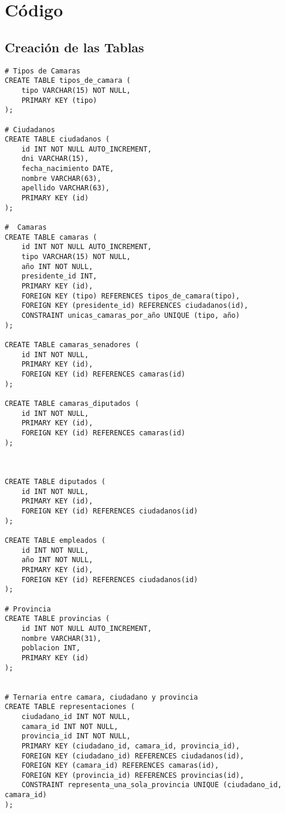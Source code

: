 \section{Código}

\subsection{Creación de las Tablas}
\begin{verbatim}
# Tipos de Camaras
CREATE TABLE tipos_de_camara (
    tipo VARCHAR(15) NOT NULL,
    PRIMARY KEY (tipo)
);

# Ciudadanos
CREATE TABLE ciudadanos (
    id INT NOT NULL AUTO_INCREMENT,
    dni VARCHAR(15),
    fecha_nacimiento DATE,
    nombre VARCHAR(63),
    apellido VARCHAR(63),
    PRIMARY KEY (id)
);

#  Camaras
CREATE TABLE camaras (
	id INT NOT NULL AUTO_INCREMENT,
    tipo VARCHAR(15) NOT NULL,
    año INT NOT NULL,
    presidente_id INT,
    PRIMARY KEY (id),
    FOREIGN KEY (tipo) REFERENCES tipos_de_camara(tipo),
    FOREIGN KEY (presidente_id) REFERENCES ciudadanos(id),
    CONSTRAINT unicas_camaras_por_año UNIQUE (tipo, año)
);

CREATE TABLE camaras_senadores (
    id INT NOT NULL,
    PRIMARY KEY (id),
    FOREIGN KEY (id) REFERENCES camaras(id) 
);

CREATE TABLE camaras_diputados (
    id INT NOT NULL,
    PRIMARY KEY (id),
    FOREIGN KEY (id) REFERENCES camaras(id) 
);



CREATE TABLE diputados (
    id INT NOT NULL,	
    PRIMARY KEY (id),
    FOREIGN KEY (id) REFERENCES ciudadanos(id) 
);

CREATE TABLE empleados (
    id INT NOT NULL,
    año INT NOT NULL,	
    PRIMARY KEY (id),
    FOREIGN KEY (id) REFERENCES ciudadanos(id) 
);

# Provincia
CREATE TABLE provincias (
    id INT NOT NULL AUTO_INCREMENT,
    nombre VARCHAR(31),
    poblacion INT,
    PRIMARY KEY (id)
);


# Ternaria entre camara, ciudadano y provincia
CREATE TABLE representaciones (
    ciudadano_id INT NOT NULL,
    camara_id INT NOT NULL,
    provincia_id INT NOT NULL,
    PRIMARY KEY (ciudadano_id, camara_id, provincia_id),
    FOREIGN KEY (ciudadano_id) REFERENCES ciudadanos(id),
    FOREIGN KEY (camara_id) REFERENCES camaras(id),
    FOREIGN KEY (provincia_id) REFERENCES provincias(id),
    CONSTRAINT representa_una_sola_provincia UNIQUE (ciudadano_id, camara_id)
);


\end{verbatim}
